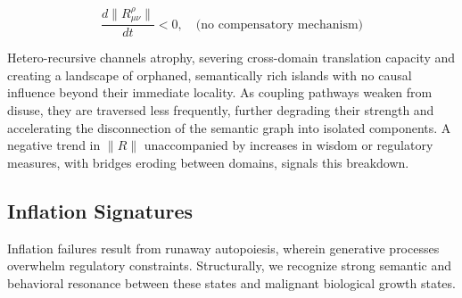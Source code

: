 \begin{itemize}
    \begin{equation}
    \frac{d\|R^\rho_{\mu\nu}\|}{dt} < 0, \quad \text{(no compensatory mechanism)}
    \end{equation}

    Hetero-recursive channels atrophy, severing cross-domain translation capacity and creating a landscape of orphaned, semantically rich islands with no causal influence beyond their immediate locality. As coupling pathways weaken from disuse, they are traversed less frequently, further degrading their strength and accelerating the disconnection of the semantic graph into isolated components. A negative trend in \(\|R\|\) unaccompanied by increases in wisdom or regulatory measures, with bridges eroding between domains, signals this breakdown.

\end{itemize}


\subsection{Inflation Signatures}
\label{16.2.3:inflation_signatures}

Inflation failures result from runaway autopoiesis, wherein generative processes overwhelm regulatory constraints. Structurally, we recognize strong semantic and behavioral resonance between these states and malignant biological growth states.

